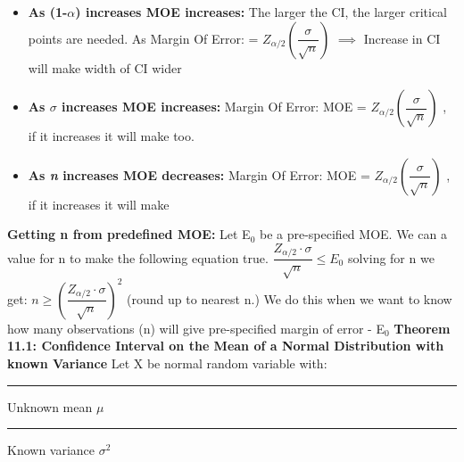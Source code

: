 \documentclass[]{article}
\begin{document}
\begin{itemize}
	\item\textbf{As (1-$\alpha$) increases MOE increases:}
	\newline The larger the CI, the larger critical points are needed. 
	\newline As  Margin Of Error:   = $Z_{\alpha / 2 } \left( \dfrac{\sigma}{\sqrt{n}} \right)$ 
	\newline $\implies$ Increase in CI will make width of CI wider
	\item\textbf{As $\sigma$ increases MOE increases:}
	\newline
	\newline Margin Of Error: MOE = $Z_{\alpha / 2 } \left( \dfrac{\sigma}{\sqrt{n}} \right)$ , if it increases it will make  too.
	\item\textbf{As \textit{n} increases MOE decreases:}
		\newline
	\newline Margin Of Error: MOE = $Z_{\alpha / 2 } \left( \dfrac{\sigma}{\sqrt{n}} \right)$ , if it increases it will make 
	\newline
\end{itemize}
\textbf{Getting n from predefined MOE:} 
\newline Let E$_0$ be a pre-specified MOE. We can a value for n to make the following equation true.
\newline
\newline $\dfrac{Z_{\alpha / 2} \cdot \sigma}{\sqrt{n}}  \le E_0 $ solving for n we get: $n \ge \left( \dfrac{Z_{\alpha / 2} \cdot \sigma}{\sqrt{n} } \right)^2 $ (round up to nearest n.)
\newline
\newline We do this when we want to know how many observations (n) will give pre-specified margin of error - E$_0$
\newline
\newline
\newline
\newline
\Large\textbf{Theorem 11.1: Confidence Interval on the Mean of a Normal Distribution with known Variance}
\newline Let X be normal random variable with:
\newline\Large\rule{1.3cm}{0pt} Unknown mean $\mu$
\newline\Large\rule{1.3cm}{0pt} Known variance $\sigma ^2$
\end{document}
